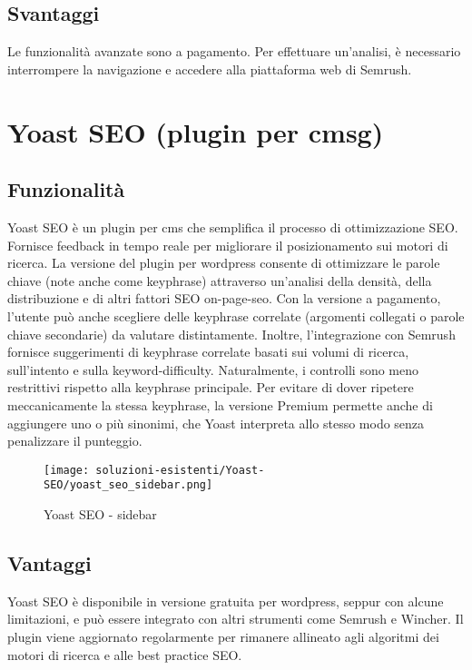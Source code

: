 \subsection{Svantaggi}
\par Le funzionalità avanzate sono a pagamento. Per effettuare un'analisi, è necessario interrompere la navigazione e accedere alla piattaforma web di Semrush.

\section{Yoast SEO (plugin per \gls{cmsg})}

\subsection{Funzionalità}
\par Yoast SEO è un plugin per \gls{cms} che semplifica il processo di ottimizzazione SEO. Fornisce feedback in tempo reale per migliorare il posizionamento sui motori di ricerca. La versione del plugin per \gls{wordpress} consente di ottimizzare le parole chiave (note anche come keyphrase) attraverso un'analisi della densità, della distribuzione e di altri fattori SEO \gls{on-page-seo}. Con la versione a pagamento, l'utente può anche scegliere delle keyphrase correlate (argomenti collegati o parole chiave secondarie) da valutare distintamente. Inoltre, l'integrazione con Semrush fornisce suggerimenti di keyphrase correlate basati sui volumi di ricerca, sull'intento e sulla \gls{keyword-difficulty}. Naturalmente, i controlli sono meno restrittivi rispetto alla keyphrase principale. Per evitare di dover ripetere meccanicamente la stessa keyphrase, la versione Premium permette anche di aggiungere uno o più sinonimi, che Yoast interpreta allo stesso modo senza penalizzare il punteggio.

\begin{figure}[H]
    \centering 
    \texttt{[image: soluzioni-esistenti/Yoast-SEO/yoast\_seo\_sidebar.png]} 
    \caption{Yoast SEO - sidebar}
\end{figure}

\subsection{Vantaggi}
\par Yoast SEO è disponibile in versione gratuita per \gls{wordpress}, seppur con alcune limitazioni, e può essere integrato con altri strumenti come Semrush e Wincher. Il plugin viene aggiornato regolarmente per rimanere allineato agli algoritmi dei motori di ricerca e alle best practice SEO.

